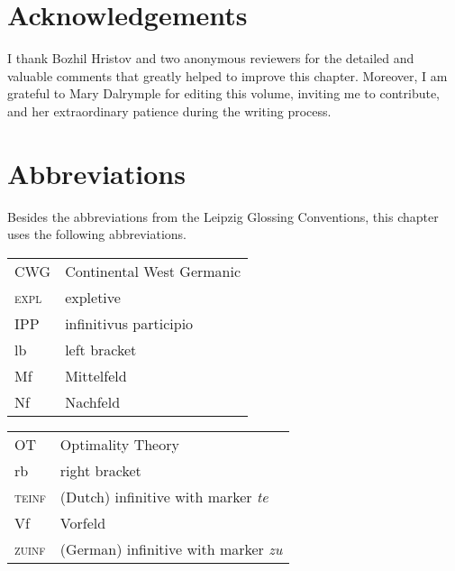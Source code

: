 \documentclass[output=paper,hidelinks]{langscibook}
\begin{document}
\section*{Acknowledgements}

I thank Bozhil Hristov and two anonymous reviewers for the detailed
and valuable comments that greatly helped to improve this
chapter. Moreover, I am grateful to Mary Dalrymple for editing this
volume, inviting me to contribute, and her extraordinary patience
during the writing process.

\section*{Abbreviations}

Besides the abbreviations from the Leipzig Glossing Conventions, this
chapter uses the following abbreviations.\medskip

\noindent
\begin{tabularx}{.45\textwidth}{@{}lQ}
CWG & Continental West Germanic\\
\textsc{expl} & expletive\\
IPP & infinitivus participio\\
lb & left bracket\\
Mf & Mittelfeld\\
Nf & Nachfeld\\
\end{tabularx}
\begin{tabularx}{.45\textwidth}{lQ@{}}
OT  & Optimality Theory\\
rb & right bracket\\
\textsc{teinf} & (Dutch) infinitive with marker \textit{te}\\
Vf & Vorfeld\\
\textsc{zuinf} & (German) infinitive with marker \textit{zu}
\end{tabularx}

\printbibliography[heading=subbibliography,notkeyword=this]
\end{document}
